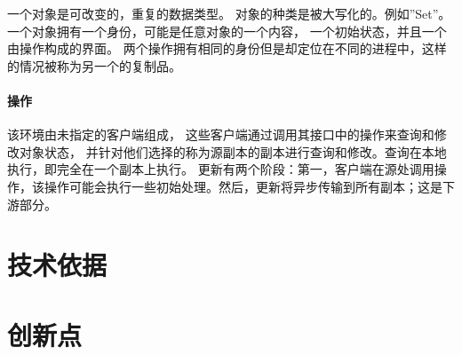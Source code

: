 \documentclass[11pt]{article}
\begin{document}
一个对象是可改变的，重复的数据类型。
对象的种类是被大写化的。例如”Set”。
一个对象拥有一个身份，可能是任意对象的一个内容，
一个初始状态，并且一个由操作构成的界面。
两个操作拥有相同的身份但是却定位在不同的进程中，这样的情况被称为另一个的复制品。

\paragraph{操作}
该环境由未指定的客户端组成，
这些客户端通过调用其接口中的操作来查询和修改对象状态，
并针对他们选择的称为源副本的副本进行查询和修改。查询在本地执行，即完全在一个副本上执行。
更新有两个阶段：第一，客户端在源处调用操作，该操作可能会执行一些初始处理。然后，更新将异步传输到所有副本；这是下游部分。
\section{技术依据}
\section{创新点}

\nocite{*}


\end{document}
